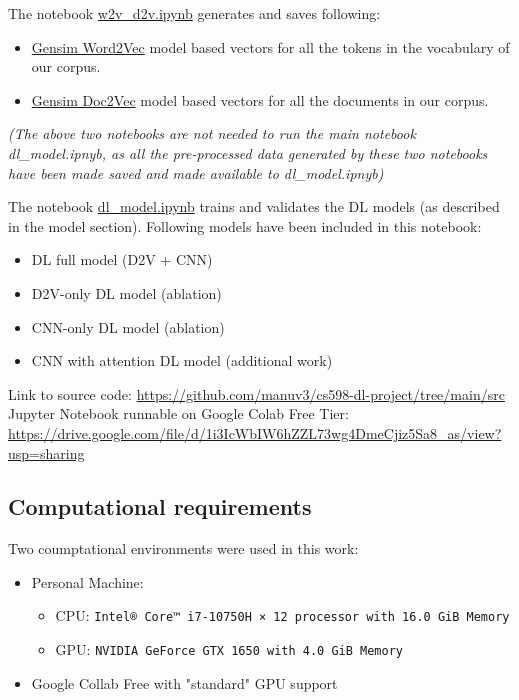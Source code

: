 \documentclass[11pt,a4paper]{article}
\begin{document}
The notebook \href{https://github.com/manuv3/cs598-dl-project/blob/main/src/w2v\_d2v.ipynb}{w2v\_d2v.ipynb} generates and saves following:
	\begin{itemize}
		\item \href{https://radimrehurek.com/gensim/models/word2vec.html}{Gensim Word2Vec} model based vectors for all the tokens in the vocabulary of our corpus.
		\item \href{https://radimrehurek.com/gensim/models/doc2vec.html}{Gensim Doc2Vec} model based vectors for all the documents in our corpus.
	\end{itemize}

\textit{(The above two notebooks are not needed to run the main notebook dl\_model.ipnyb, as all the pre-processed data generated by these two notebooks have been made saved and made available to dl\_model.ipnyb)}
	
The notebook \href{https://github.com/manuv3/cs598-dl-project/blob/main/src/dl\_model.ipynb}{dl\_model.ipynb} trains and validates the DL models (as described in the model section). Following models have been included in this notebook:
		\begin{itemize}
			\item DL full model (D2V + CNN)
			\item D2V-only DL model (ablation)
			\item CNN-only DL model (ablation)
			\item CNN with attention DL model (additional work)
		\end{itemize}

Link to source code: \url{https://github.com/manuv3/cs598-dl-project/tree/main/src}
Jupyter Notebook runnable on Google Colab Free Tier: \url{https://drive.google.com/file/d/1i3IcWbIW6hZZL73wg4DmeCjiz5Sa8_as/view?usp=sharing}


\subsection{Computational requirements}

Two coumptational environments were used in this work:
\begin{itemize}
	\item Personal Machine: 
	\begin{itemize}
		\item CPU: \texttt{Intel® Core™ i7-10750H × 12 processor with 16.0 GiB Memory}
		\item GPU: \texttt{NVIDIA GeForce GTX 1650 with 4.0 GiB Memory}
	\end{itemize}
	\item Google Collab Free with "standard" GPU support
\end{itemize}
\end{document}
